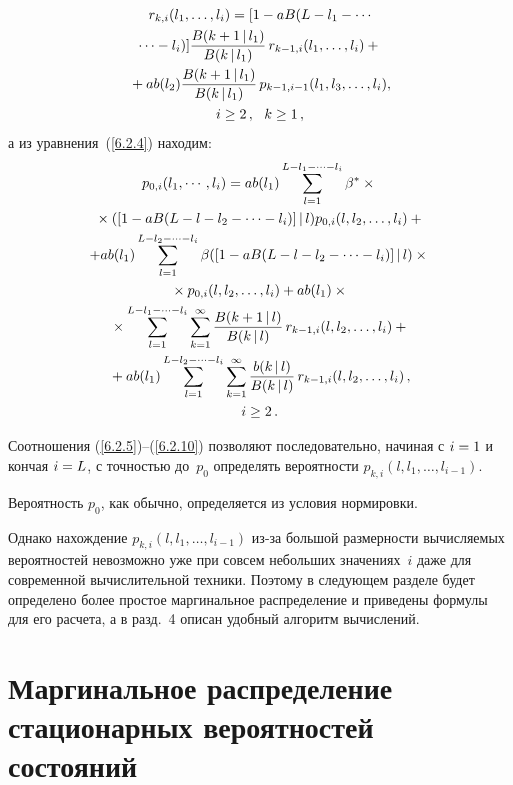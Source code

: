 \begin{multicols}{2}
\noindent
\begin{multline}
r_{k,i}(l_1,\ldots,l_i)
=[1 - a B(L-l_1-\cdots\\
\cdots -l_i)]
\displaystyle\frac{\displaystyle B(k+1\,|\,l_1)\mathstrut}{\displaystyle  B(k\,|\,l_1)\mathstrut}
\,r_{k-1,i}(l_1,\ldots,l_i)
 +{}
\\
{}+
a b(l_2)
\displaystyle\frac{\displaystyle B(k+1\,|\,l_1)\mathstrut}{\displaystyle  B(k\,|\,l_1)\mathstrut}
\,p_{k-1,i-1}(l_1,l_3,\ldots,l_i),
\\
 i \ge 2\,,\ \ k\ge 1\,,
\label{6.2.9}
\end{multline}
а из уравнения~(\ref{6.2.4}) находим:
\begin{multline}
p_{0,i}(l_1,\cdots,l_i)
=a b(l_1)
\sum\limits_{l=1}^{L-l_1-\cdots-l_i}
\beta^*\times{}\\
{}\times([1 - a B(L-l-l_2-\cdots-l_i)]\,|\,l)
p_{0,i}(l,l_2,\ldots,l_i)
 +{}
\\
+a b(l_1)
\sum\limits_{l=1}^{L-l_2-\cdots-l_i}
\beta([1 - a B(L-l-l_2-\cdots-l_i)]\,|\,l)\times{}\\
{}\times
p_{0,i}(l,l_2,\ldots,l_i)
 +a b(l_1)\times{}
\\
{}\times
\sum\limits_{l=1}^{L-l_1-\cdots-l_i}
\sum\limits_{k=1}^\infty
\displaystyle\frac{\displaystyle B(k+1\,|\,l)\mathstrut}{\displaystyle  B(k\,|\,l)\mathstrut}\,
r_{k-1,i}(l,l_2,\ldots,l_i)
 +{}\\
{}+ a b(l_1)
\sum\limits_{l=1}^{L-l_2-\cdots-l_i}
\sum\limits_{k=1}^\infty
\displaystyle\frac{\displaystyle b(k\,|\,l)\mathstrut}{\displaystyle B(k\,|\,l)\mathstrut}\,
r_{k-1,i}(l,l_2,\ldots,l_i)
\,,
\\
  i \ge 2\,.
\label{6.2.10}
\end{multline}

Соотношения (\ref{6.2.5})--(\ref{6.2.10}) позволяют
последовательно, начиная с $i\hm=1$ и кончая $i\hm=L$,
с точностью до~$p_0$
определять вероятности $p_{k,i}(l,l_1,\ldots,l_{i-1})$.

Вероятность $p_0$, как обычно, определяется из условия
нормировки.

Однако нахождение $p_{k,i}(l,l_1,\ldots,l_{i-1})$
из-за большой размерности вычисляемых вероятностей
невозможно уже при совсем небольших значениях~$i$ даже для современной вычислительной техники.
Поэтому в следующем разделе будет определено более простое маргинальное распределение и приведены
формулы для его расчета, а в разд.~4 описан удобный алгоритм вычислений.

\section{Маргинальное распределение стационарных
вероятностей состояний}


\end{multicols}
